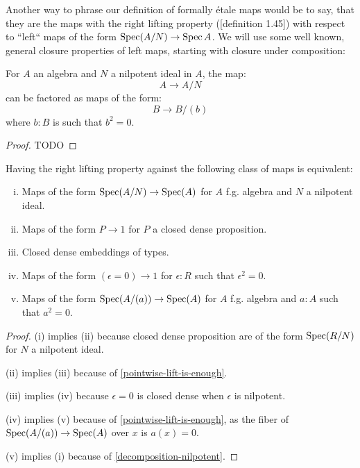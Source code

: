 Another way to phrase our definition of formally étale maps would be to say,
that they are the maps with the right lifting property (\cite{modalities}[definition 1.45]) with respect to ``left`` maps of the form $\operatorname{Spec} (A/N)\to \operatorname{Spec} A$.
We will use some well known, general closure properties of left maps, starting with closure under composition:

\begin{lemma}%
\label{decomposition-nilpotent}
For $A$ an algebra and $N$ a nilpotent ideal in $A$, the map:
\[A
\to A/N
\] 
can be factored as maps of the form:
\[
B\to B/(b)
\]
where $b:B$ is such that $b^2=0$.
\end{lemma}

\begin{proof}
TODO
\end{proof}

\begin{lemma}
\label{equivalence-etale}
Having the right lifting property against the following class of maps is equivalent:
\begin{enumerate}[(i)]
\item Maps of the form $\operatorname{Spec}(A/N)\to \operatorname{Spec}(A)$ for $A$ f.g. algebra and $N$ a nilpotent ideal.
\item Maps of the form $P\to 1$ for $P$ a closed dense proposition.
\item Closed dense embeddings of types.
\item Maps of the form $(\epsilon=0)\to 1$ for $\epsilon:R$ such that $\epsilon^2=0$.
\item Maps of the form $\operatorname{Spec}(A/(a)) \to \operatorname{Spec}(A)$ for $A$ f.g. algebra and $a:A$ such that $a^2=0$.
\end{enumerate}
\end{lemma}

\begin{proof}
(i) implies (ii) because closed dense proposition are of the form $\operatorname{Spec}(R/N)$ for $N$ a nilpotent ideal.

(ii) implies (iii) because of \cref{pointwise-lift-is-enough}.

(iii) implies (iv) because $\epsilon=0$ is closed dense when $\epsilon$ is nilpotent.

(iv) implies (v) because of \cref{pointwise-lift-is-enough}, as the fiber of $\operatorname{Spec}(A/(a)) \to \operatorname{Spec}(A)$ over $x$ is $a(x)=0$.

(v) implies (i) because of \cref{decomposition-nilpotent}.
\end{proof}

